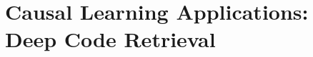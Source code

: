 \documentclass[cpp,11pt]{wmthesis}
\begin{document}
\makeThesisProlog












\part{Causal Learning Applications: \hfill \break Deep Code Retrieval}





%

\end{document}

